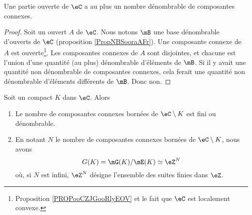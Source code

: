 \begin{lemma} 	\label{LEMooBHOGooXxBYGA}
	Une partie ouverte de \( \eC\) a au plus un nombre dénombrable de composantes connexes.
\end{lemma}

\begin{proof}
	Soit un ouvert \( A\) de \( \eC\). Nous notons \( \mB\) une base dénombrable d'ouverts de \( \eC\) (proposition \ref{PropNBSooraAFr}). Une composante connexe de \( A\) est ouverte\footnote{Proposition \ref{PROPooCZJGooRlyEOV} et le fait que \( \eC\) est localement convexe.}. Les composantes connexes de \( A\) sont disjointes, et chacune est l'union d'une quantité (au plus) dénombrable d'éléments de \( \mB\). Si il y avait une quantité non dénombrable de composantes connexes, cela ferait une quantité non dénombrable d'éléments différents de \( \mB\). Donc non.
\end{proof}

\begin{theorem}		\label{THOooDGXSooMMHTds}
	Soit un compact \( K\) dans \( \eC\). Alors
	\begin{enumerate}
		\item
		      Le nombre de composantes connexes bornées de \( \eC\setminus K\) est fini ou dénombrable.
		\item		\label{ITEMooWLGDooZGORrP}
		      En notant \( N\) le nombre de composantes connexes bornées de \( \eC\setminus K\), nous avons
		      \begin{equation}
			      G(K)=\mG(K)/\mE(K)\simeq \eZ^N
		      \end{equation}
		      où, si \( N\) est infini, \( \eZ^N\) désigne l'ensemble des suites finies dans \( \eZ\).
	\end{enumerate}
\end{theorem}

